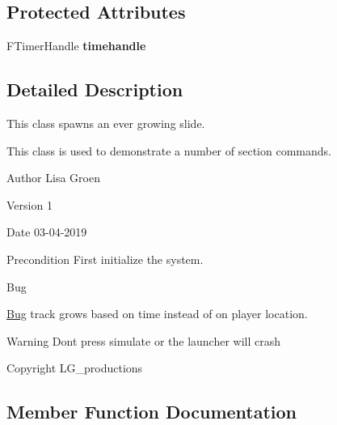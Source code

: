 \subsection*{Protected Attributes}
\begin{DoxyCompactItemize}
\item 
\mbox{\label{class_a_track_generator_ad9f912deae33031f6ed1c924d8ecf24f}} 
F\+Timer\+Handle {\bfseries timehandle}
\end{DoxyCompactItemize}


\subsection{Detailed Description}
This class spawns an ever growing slide. 

This class is used to demonstrate a number of section commands. \begin{DoxyAuthor}{Author}
Lisa Groen 
\end{DoxyAuthor}
\begin{DoxyVersion}{Version}
1 
\end{DoxyVersion}
\begin{DoxyDate}{Date}
03-\/04-\/2019 
\end{DoxyDate}
\begin{DoxyPrecond}{Precondition}
First initialize the system. 
\end{DoxyPrecond}
\begin{DoxyRefDesc}{Bug}
\item[\mbox{\hyperlink{bug__bug000001}{Bug}}]track grows based on time instead of on player location. \end{DoxyRefDesc}
\begin{DoxyWarning}{Warning}
Don\textquotesingle{}t press simulate or the launcher will crash 
\end{DoxyWarning}
\begin{DoxyCopyright}{Copyright}
L\+G\+\_\+productions 
\end{DoxyCopyright}


\subsection{Member Function Documentation}
\mbox{\label{class_a_track_generator_a14b4ef8eac6a9147d9849b128015a5f8}} 
